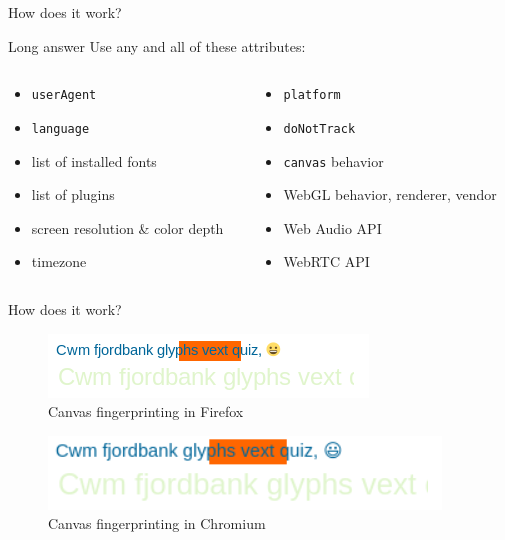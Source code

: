 \documentclass[t]{beamer}
\begin{document}
\begin{frame}{How does it work?}
    \begin{block}{Long answer}
        Use any and all of these attributes:
        \begin{columns}[T]
            \begin{column}{.4\textwidth}
                \begin{itemize}
                    \item \texttt{userAgent}
                    \item \texttt{language}
                    \item list of installed fonts
                    \item list of plugins
                    \item screen resolution \& color depth
                    \item timezone
                \end{itemize}
            \end{column}
            \begin{column}{.6\textwidth}
                \begin{itemize}
                    \item \texttt{platform}
                    \item \texttt{doNotTrack}
                    \item \texttt{canvas} behavior
                    \item WebGL behavior, renderer, vendor
                    \item Web Audio API
                    \item WebRTC API
                \end{itemize}
            \end{column}
        \end{columns}
    \end{block}
\end{frame}

\begin{frame}{How does it work?}
    \begin{figure}
        \includegraphics[scale=0.6]{pic/canvas_firefox.png}
        \caption{Canvas fingerprinting in Firefox}
    \end{figure}
    \begin{figure}
        \includegraphics[scale=0.5]{pic/canvas_chromium.png}
        \caption{Canvas fingerprinting in Chromium}
    \end{figure}
\end{frame}
\end{document}
